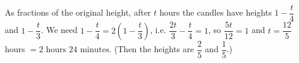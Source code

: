 As fractions of the original height, after $t$ hours the candles have heights $1-\dfrac {t}{4}$ and $1-\dfrac {t}{3}$. We need $1-\dfrac {t}{4}=2\left(1-\dfrac {t}{3}\right)$, i.e. $\dfrac{2t}{3}-\dfrac {t}{4}=1$, so $\dfrac{5t}{12}=1$ and $t=\dfrac{12}{5}$ hours $=\boxed{2\text{ hours }24\text{ minutes}}$. (Then the heights are $\dfrac{2}{5}$ and $\dfrac{1}{5}$.)
